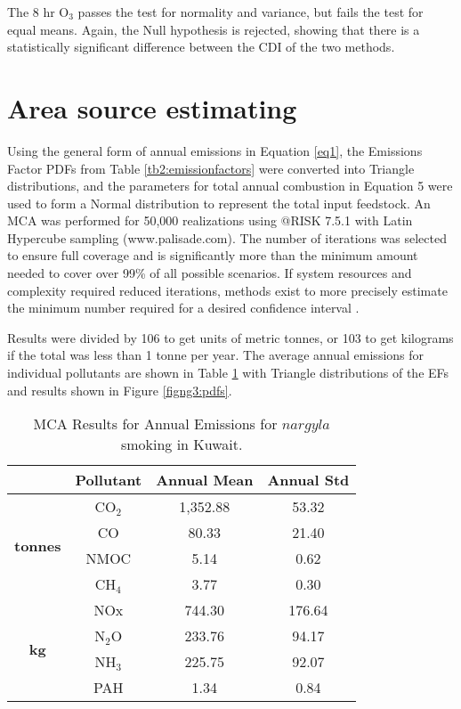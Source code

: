 The 8 hr O$_{3}$ passes the test for normality and variance, but fails the test for equal means. Again, the Null hypothesis is rejected, showing that there is a statistically significant difference between the CDI of the two methods.
\clearpage

\section{Area source estimating}

Using the general form of annual emissions in Equation \ref{eq1}, the Emissions Factor PDFs from Table \ref{tb2:emissionfactors} were converted into Triangle distributions, and the parameters for total annual combustion in Equation 5 were used to form a Normal distribution to represent the total input feedstock.  An MCA was performed for 50,000 realizations using @RISK 7.5.1 with Latin Hypercube sampling (www.palisade.com). The number of iterations was selected to ensure full coverage and is significantly more than the minimum amount needed to cover over 99\% of all possible scenarios.  If system resources and complexity required reduced iterations, methods exist to more precisely estimate the minimum number required for a desired confidence interval \citep{Bukaci2016}.

Results were divided by 106 to get units of metric tonnes, or 103 to get kilograms if the total was less than 1 tonne per year.  The average annual emissions for individual pollutants are shown in Table \ref{tb4:results} with Triangle distributions of the EFs and results shown in Figure \ref{figng3:pdfs}. 

%
\begin{table}[H]
\centering
\caption{MCA Results for Annual Emissions for $nargyla$ smoking in Kuwait.}
\label{tb4:results}
\begin{tabular}{@{}cccc@{}}
\toprule
 & \textbf{Pollutant} & \textbf{Annual Mean} & \textbf{Annual Std} \\ \midrule
\multirow{4}{*}{\textbf{tonnes}} & CO$_{2}$ & 1,352.88 & 53.32 \\
 & CO & 80.33 & 21.40 \\
 & NMOC & 5.14 & 0.62 \\
 & CH$_{4}$ & 3.77 & 0.30 \\ \midrule
\multirow{4}{*}{\textbf{kg}} & NOx & 744.30 & 176.64 \\
 & N$_{2}$O & 233.76 & 94.17 \\
 & NH$_{3}$ & 225.75 & 92.07 \\
 & PAH & 1.34 & 0.84 \\ \bottomrule 
\end{tabular}
\end{table}
% 
 
